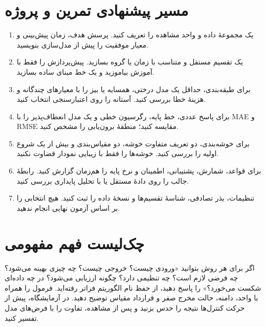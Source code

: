 \documentclass[12pt,a4paper,oneside]{report}
\begin{document}
\section{مسیر پیشنهادی تمرین و پروژه}
\begin{enumerate}
\item یک مجموعهٔ داده و واحد مشاهده را تعریف کنید. پرسش هدف، زمان پیش‌بینی و معیار موفقیت را پیش از مدل‌سازی بنویسید.
\item یک تقسیم مستقل و متناسب با زمان یا گروه بسازید. پیش‌پردازش را فقط با آموزش بیاموزید و یک خط مبنای ساده بسازید.
\item برای طبقه‌بندی، حداقل یک مدل درختی، همسایه یا بیز را با معیارهای چندگانه و هزینهٔ خطا بررسی کنید. آستانه را روی اعتبارسنجی انتخاب کنید.
\item برای پاسخ عددی، خط پایه، رگرسیون خطی و یک مدل انعطاف‌پذیر را با MAE و RMSE مقایسه کنید؛ منطقهٔ برون‌یابی را مشخص کنید.
\item برای خوشه‌بندی، دو تعریف متفاوت خوشه، دو مقیاس‌بندی و بیش از یک شروع اولیه را بررسی کنید. خوشه‌ها را فقط با زیبایی نمودار قضاوت نکنید.
\item برای قواعد، شمارش، پشتیبانی، اطمینان و نرخ پایه را هم‌زمان گزارش کنید. رابطهٔ جالب را روی دادهٔ مستقل یا با تحلیل پایداری بررسی کنید.
\item تنظیمات، بذر تصادفی، شناسهٔ تقسیم‌ها و نسخهٔ داده را ثبت کنید. هیچ انتخابی را بر اساس آزمون نهایی انجام ندهید.
\end{enumerate}

\section{چک‌لیست فهم مفهومی}
اگر برای هر روش بتوانید «ورودی چیست؟ خروجی چیست؟ چه چیزی بهینه می‌شود؟ چه فرضی لازم است؟ چه تنظیمی دارد؟ چگونه ارزیابی می‌شود؟ در چه داده‌ای شکست می‌خورد؟» را پاسخ دهید، از حفظ نام الگوریتم فراتر رفته‌اید. فرمول را همراه با واحد، دامنه، حالت مخرج صفر و قرارداد مقیاس توضیح دهید. در آزمایشگاه، پیش از حرکت کنترل‌ها نتیجه را حدس بزنید و پس از مشاهده، تفاوت را با فرض‌های مدل تفسیر کنید.
\end{document}
